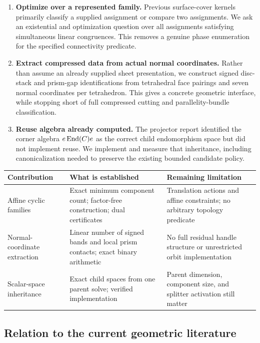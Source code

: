 \begin{enumerate}
\item \textbf{Optimize over a represented family.} Previous surface-cover
kernels primarily classify a supplied assignment or compare two assignments.
We ask an existential and optimization question over all assignments
satisfying simultaneous linear congruences. This removes a genuine phase
enumeration for the specified connectivity predicate.
\item \textbf{Extract compressed data from actual normal coordinates.}
Rather than assume an already supplied sheet presentation, we construct
signed disc-stack and prism-gap identifications from tetrahedral face
pairings and seven normal coordinates per tetrahedron. This gives a
concrete geometric interface, while stopping short of full compressed
cutting and parallelity-bundle classification.
\item \textbf{Reuse algebra already computed.} The projector report
identified the corner algebra $e\operatorname{End}(C)e$ as the correct child
endomorphism space but did not implement reuse. We implement and measure
that inheritance, including canonicalization needed to preserve the
existing bounded candidate policy.
\end{enumerate}

\begin{center}
\small
\begin{tabular}{>{\raggedright\arraybackslash}p{.25\linewidth}>{\raggedright\arraybackslash}p{.34\linewidth}>{\raggedright\arraybackslash}p{.30\linewidth}}
\toprule
Contribution & What is established & Remaining limitation\\
\midrule
Affine cyclic families & Exact minimum component count; factor-free
construction; dual certificates & Translation actions and affine
constraints; no arbitrary topology predicate\\
Normal-coordinate extraction & Linear number of signed bands and local
prism contacts; exact binary arithmetic & No full residual handle
structure or unrestricted orbit implementation\\
Scalar-space inheritance & Exact child spaces from one parent solve;
verified implementation & Parent dimension, component size, and splitter
activation still matter\\
\bottomrule
\end{tabular}
\end{center}

\subsection{Relation to the current geometric literature}

